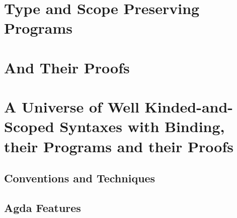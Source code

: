 \documentclass{memoir}
\begin{document}
\frontmatter



\mainmatter
\pagestyle{ruled}
\begin{KeepFromToc}
\tableofcontents
\end{KeepFromToc}


%




\part{Type and Scope Preserving Programs}
\label{type-scope-semantics}






\part{And Their Proofs}
\label{properties}





\part{A Universe of Well Kinded-and-Scoped Syntaxes with Binding, their Programs and their Proofs}
\label{a-universe}













\cleardoublepage{}


\appendix

\chapter{Conventions and Techniques}\label{sec:conventions}
\allconventions
\alltechniques

\chapter{Agda Features}\label{sec:features}
\allfeatures

\clearpage
\listoffigures

\end{document}
